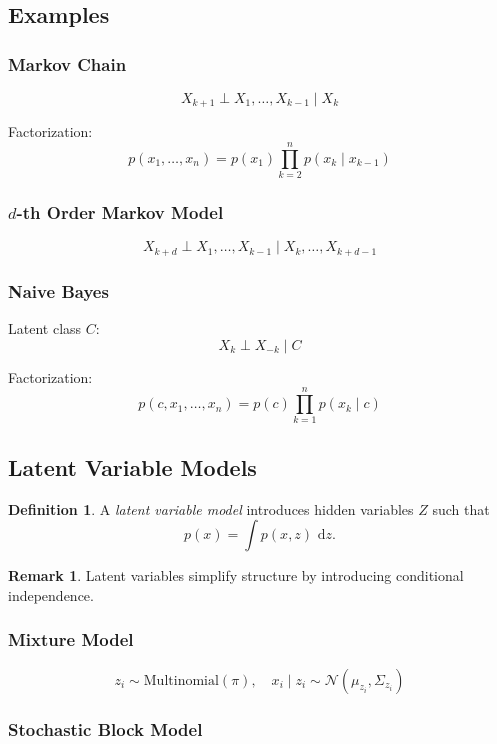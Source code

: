 \documentclass[12pt,oneside]{book}
\numberwithin{equation}{section}
\theoremstyle{definition}
\newtheorem{definition}{Definition}[section]
\newtheorem{remark}{Remark}[section]
\theoremstyle{plain}
\theoremstyle{remark}
\newcommand{\dd}{\,\mathrm{d}}
\newcommand{\Normal}{\mathcal{N}}
\begin{document}
\subsection{Examples}

\subsubsection{Markov Chain}

\[
X_{k+1} \perp X_1,\dots,X_{k-1} \mid X_k
\]

Factorization:
\[
p(x_1,\dots,x_n)
=
p(x_1)\prod_{k=2}^n p(x_k \mid x_{k-1})
\]

\subsubsection{$d$-th Order Markov Model}

\[
X_{k+d} \perp X_1,\dots,X_{k-1} \mid X_k,\dots,X_{k+d-1}
\]

\subsubsection{Naive Bayes}

Latent class $C$:
\[
X_k \perp X_{-k} \mid C
\]

Factorization:
\[
p(c,x_1,\dots,x_n)
=
p(c)\prod_{k=1}^n p(x_k \mid c)
\]


\subsection{Latent Variable Models}

\begin{definition}
A \emph{latent variable model} introduces hidden variables $Z$ such that
\[
p(x) = \int p(x,z)\,\dd z.
\]
\end{definition}

\begin{remark}
Latent variables simplify structure by introducing conditional independence.
\end{remark}

\subsubsection{Mixture Model}

\[
z_i \sim \mathrm{Multinomial}(\pi), \quad
x_i \mid z_i \sim \Normal(\mu_{z_i}, \Sigma_{z_i})
\]

\subsubsection{Stochastic Block Model}
\end{document}
